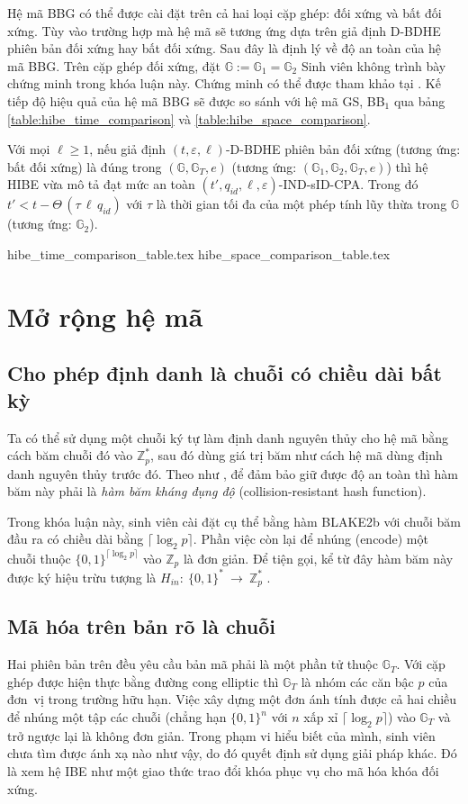 \documentclass[class=report, crop=false]{standalone}
\begin{document}
		Hệ mã BBG có thể được cài đặt trên cả hai loại cặp ghép: đối xứng và bất đối xứng. Tùy vào trường hợp mà hệ mã sẽ tương ứng dựa trên giả định D-BDHE phiên bản đối xứng hay bất đối xứng. Sau đây là định lý về độ an toàn của hệ mã BBG. Trên cặp ghép đối xứng, đặt $\mathbb{G} := \mathbb{G}_1 = \mathbb{G}_2$ Sinh viên không trình bày chứng minh trong khóa luận này. Chứng minh có thể được tham khảo tại \cite{DBLP:conf/eurocrypt/BonehBG05}. Kế tiếp độ hiệu quả của hệ mã BBG sẽ được so sánh với hệ mã GS, BB$_1$ qua bảng \ref{table:hibe_time_comparison} và \ref{table:hibe_space_comparison}.
		\newpage
		\begin{theorem}
			Với mọi $\ell \geq 1$, nếu giả định $(t, \varepsilon, \ell)$-D-BDHE phiên bản đối xứng (tương ứng: bất đối xứng) là đúng trong $(\mathbb{G}, \mathbb{G}_T, e)$ (tương ứng: $(\mathbb{G}_1, \mathbb{G}_2, \mathbb{G}_T, e)$) thì hệ HIBE vừa mô tả đạt mức an toàn $(t', q_{id}, \ell, \varepsilon)$-IND-sID-CPA. Trong đó $t' < t - \Theta\,(\tau\, \ell\, q_{id})$ với $\tau$ là thời gian tối đa của một phép tính lũy thừa trong $\mathbb{G}$ (tương ứng: $\mathbb{G}_2$).
		\end{theorem}
		{hibe_time_comparison_table.tex}
		{hibe_space_comparison_table.tex}
	\section{Mở rộng hệ mã}
		\subsection{Cho phép định danh là chuỗi có chiều dài bất kỳ}
			Ta có thể sử dụng một chuỗi ký tự làm định danh nguyên thủy cho hệ mã bằng cách băm chuỗi đó vào $\mathbb{Z}_p^*$, sau đó dùng giá trị băm như cách hệ mã dùng định danh nguyên thủy trước đó. Theo như \cite[mục 3.1]{DBLP:conf/eurocrypt/BonehBG05}, để đảm bảo giữ được độ an toàn thì hàm băm này phải là \textit{hàm băm kháng đụng độ} (collision-resistant hash function).

			Trong khóa luận này, sinh viên cài đặt cụ thể bằng hàm BLAKE2b \cite{DBLP:conf/acns/AumassonNWW13} với chuỗi băm đầu ra có chiều dài bằng $\lceil \log_2 p \rceil$. Phần việc còn lại để nhúng (encode) một chuỗi thuộc $\{0, 1\}^{\lceil \log_2 p \rceil}$ vào $\mathbb{Z}_p$ là đơn giản. Để tiện gọi, kể từ đây hàm băm này được ký hiệu trừu tượng là $H_{in}: 	\ \{0, 1 \}^* \ \rightarrow \ \mathbb{Z}_p^*$ .
		\subsection{Mã hóa trên bản rõ là chuỗi}
			Hai phiên bản trên đều yêu cầu bản mã phải là một phần tử thuộc $\mathbb{G}_T$. Với cặp ghép được hiện thực bằng đường cong elliptic thì $\mathbb{G}_T$ là nhóm các căn bậc $p$ của đơn~vị trong trường hữu hạn. Việc xây dựng một đơn ánh tính được cả hai chiều để nhúng một tập các chuỗi (chẳng hạn $\{0, 1\}^n$ với $n$ xấp xỉ $\lceil \log_2 p \rceil$) vào $\mathbb{G}_T$ và trở ngược lại là không đơn giản. Trong phạm vi hiểu biết của mình, sinh viên chưa tìm được ánh xạ nào như vậy, do đó quyết định sử dụng giải pháp khác. Đó là xem hệ IBE như một giao thức trao đổi khóa phục vụ cho mã hóa khóa đối xứng.
\end{document}
